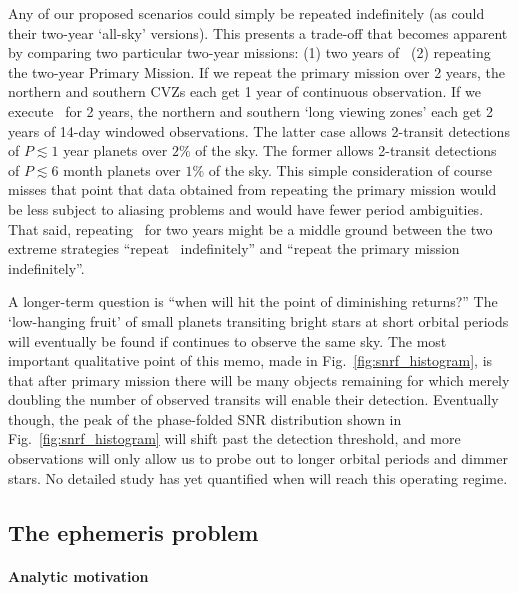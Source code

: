 Any of our proposed scenarios could simply be repeated indefinitely
(as could their two-year `all-sky' versions).  This presents a
trade-off that becomes apparent by comparing two particular two-year
missions: (1) two years of \hemis\, (2) repeating the two-year Primary
Mission.  If we repeat the primary mission over 2 years, the northern
and southern CVZs each get 1 year of continuous observation.  If we
execute \hemis\ for 2 years, the northern and southern `long viewing
zones' each get 2 years of 14-day windowed observations.  The latter
case allows 2-transit detections of $P\lesssim1$ year planets over
$2\%$ of the sky.  The former allows 2-transit detections of
$P\lesssim6$ month planets over $1\%$ of the sky.  This simple
consideration of course misses that point that data obtained from
repeating the primary mission would be less subject to aliasing
problems and would have fewer period ambiguities.  That said,
repeating \hemis\ for two years might be a middle ground between the
two extreme strategies ``repeat \npole\ indefinitely'' and ``repeat
the primary mission indefinitely''.

A longer-term question is ``when will \tess hit the point of
diminishing returns?''  The `low-hanging fruit' of small planets
transiting bright stars at short orbital periods will eventually be
found if \tess continues to observe the same sky.  The most important
qualitative point of this memo, made in Fig.~\ref{fig:snrf_histogram},
is that after \tesss primary mission there will be many objects
remaining for which merely doubling the number of observed transits
will enable their detection.  Eventually though, the peak of the
phase-folded SNR distribution shown in Fig.~\ref{fig:snrf_histogram}
will shift past the detection threshold, and more observations will
only allow us to probe out to longer orbital periods and dimmer stars.
No detailed study has yet quantified when \tess will reach this
operating regime.

\subsection{The ephemeris problem}
\label{sec:ephemeris_times}

\paragraph{Analytic motivation}

